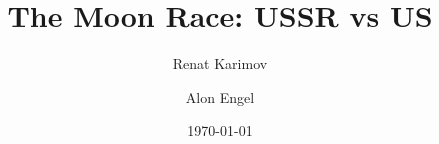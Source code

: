 \title{The Moon Race: USSR vs US}
\newcommand{\BookTitle}{The Moon Race: USSR vs US}
\author{Renat Karimov \and Alon Engel}
\date{\today}

